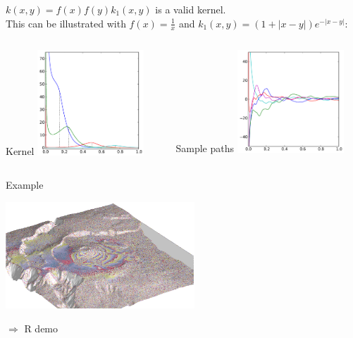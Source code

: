 \documentclass{beamer}
\begin{document}
\begin{frame}{}
\begin{example}
$k(x,y) = f(x)f(y)k_1(x,y)$ is a valid kernel.\\
\vspace{0.5cm}
This can be illustrated with $f(x) = \frac1x$ and $k_1(x,y) = (1 + |x-y|) e^{-|x-y|}$:\\
\begin{columns}[c]
\begin{column}{5cm}
\begin{center}
Kernel
\includegraphics[width=4cm]{figures/python/newfromold-prodfunc-k}
\end{center}
\end{column}
\begin{column}{5cm}
\begin{center}
Sample paths
\includegraphics[width=4cm]{figures/python/newfromold-prodfunc-traj}
\end{center}
\end{column}
\end{columns}
\end{example}
\end{frame}


\begin{frame}{}
\begin{exampleblock}{Example}
\begin{center}
\includegraphics[height=4cm]{figures/piton_fournaise_5dike_intrusions_98_00} 
\end{center}
\end{exampleblock}
\alert{$\Rightarrow$ R demo}
\end{frame}
\end{document}

